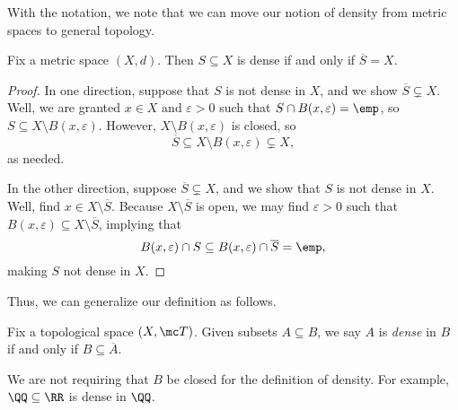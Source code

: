 \documentclass[../notes.tex]{subfiles}
\begin{document}
With the notation, we note that we can move our notion of density from metric spaces to general topology.
\begin{lemma} \label{lem:denseformetricspaces}
	Fix a metric space $(X,d)$. Then $S\subseteq X$ is dense if and only if $\overline S=X$.
\end{lemma}
\begin{proof}
	In one direction, suppose that $S$ is not dense in $X$, and we show $\overline S\subsetneq X$. Well, we are granted $x\in X$ and $\varepsilon>0$ such that $S\cap B(x,\varepsilon)=\emp$, so $S\subseteq X\setminus B(x,\varepsilon)$. However, $X\setminus B(x,\varepsilon)$ is closed, so
	\[\overline S\subseteq X\setminus B(x,\varepsilon)\subsetneq X,\]
	as needed.

	In the other direction, suppose $\overline S\subsetneq X$, and we show that $S$ is not dense in $X$. Well, find $x\in X\setminus\overline S$. Because $X\setminus\overline S$ is open, we may find $\varepsilon>0$ such that $B(x,\varepsilon)\subseteq X\setminus\overline S$, implying that
	\[B(x,\varepsilon)\cap S\subseteq B(x,\varepsilon)\cap\overline S=\emp,\]
	making $S$ not dense in $X$.
\end{proof}
Thus, we can generalize our definition as follows.
\begin{defi}[Dense]
	Fix a topological space $(X,\mc T)$. Given subsets $A\subseteq B$, we say $A$ is \textit{dense} in $B$ if and only if $B\subseteq\overline A$.
\end{defi}
\begin{remark}
	We are not requiring that $B$ be closed for the definition of density. For example, $\QQ\subseteq\RR$ is dense in $\QQ$.
\end{remark}
\end{document}
